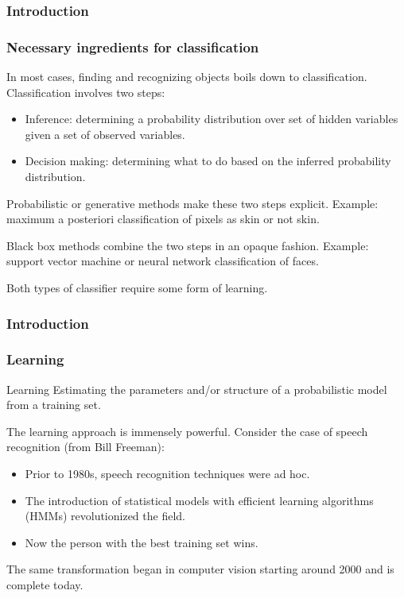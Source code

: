\documentclass[aspectratio=169]{beamer}
\begin{document}
\begin{frame}
\frametitle{Introduction}
\frametitle{Necessary ingredients for classification}

In most cases, finding and recognizing objects boils down to
classification.  Classification involves two steps:
\begin{itemize}
\item \alert{Inference}: determining a probability distribution over
  set of hidden variables given a set of observed variables.
\item \alert{Decision making}: determining what to do based on the
  inferred probability distribution.
\end{itemize}

\medskip

\alert{Probabilistic} or \alert{generative} methods make these two
steps explicit.  Example: maximum a posteriori classification of
pixels as skin or not skin.

\medskip

\alert{Black box} methods combine the two steps in an opaque fashion.
Example: support vector machine or neural network classification of
faces.

\medskip

Both types of classifier require some form of \alert{learning}.

\end{frame}


\begin{frame}
\frametitle{Introduction}
\frametitle{Learning}

\begin{block}{Learning}
  Estimating the \alert{parameters} and/or \alert{structure} of a
  probabilistic model from a \alert{training set}.
\end{block}

\medskip

The learning approach is immensely powerful.  Consider the case of
speech recognition (from Bill Freeman):
\begin{itemize}
\item Prior to 1980s, speech recognition techniques were ad hoc.
\item The introduction of statistical models with efficient learning
  algorithms (HMMs) revolutionized the field.
\item Now \alert{the person with the best training set} wins.
\end{itemize}

\medskip

The same transformation began in computer vision starting around 2000
and is complete today.

\end{frame}
\end{document}
